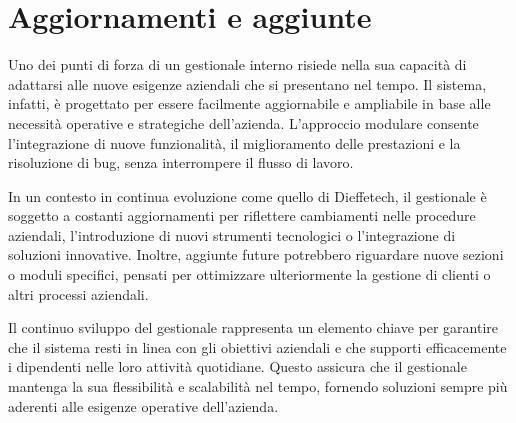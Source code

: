\section{Aggiornamenti e aggiunte}\label{sec:cap_sec_subsec_aggiornamenti_e_aggiunte}

Uno dei punti di forza di un gestionale interno risiede nella sua capacità di adattarsi alle nuove esigenze aziendali che si presentano nel tempo. Il sistema, infatti, è progettato per essere facilmente aggiornabile e ampliabile in base alle necessità operative e strategiche dell'azienda. L'approccio modulare consente l'integrazione di nuove funzionalità, il miglioramento delle prestazioni e la risoluzione di bug, senza interrompere il flusso di lavoro.

In un contesto in continua evoluzione come quello di Dieffetech, il gestionale è soggetto a costanti aggiornamenti per riflettere cambiamenti nelle procedure aziendali, l'introduzione di nuovi strumenti tecnologici o l'integrazione di soluzioni innovative. Inoltre, aggiunte future potrebbero riguardare nuove sezioni o moduli specifici, pensati per ottimizzare ulteriormente la gestione di clienti o altri processi aziendali.

Il continuo sviluppo del gestionale rappresenta un elemento chiave per garantire che il sistema resti in linea con gli obiettivi aziendali e che supporti efficacemente i dipendenti nelle loro attività quotidiane. Questo assicura che il gestionale mantenga la sua flessibilità e scalabilità nel tempo, fornendo soluzioni sempre più aderenti alle esigenze operative dell'azienda.